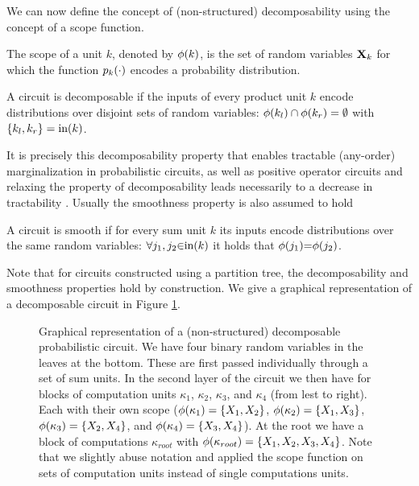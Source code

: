 We can now define the concept of (non-structured) decomposability using the concept of a scope function.


\begin{definition}[Scope]
	\label{def:scope:cond}
	The scope of a unit $k$, denoted by $\phi(k)$, is the set of random variables $\mathbf{X}_k$ for which the function $p_k (\cdot)$ encodes a probability distribution.
\end{definition}

\begin{definition}[Decomposability]
	A circuit is decomposable if the inputs of every product unit
	$k$ encode distributions over disjoint sets of random variables:
	$\phi (k_l) \cap \phi (k_r) = \emptyset$ with $\{k_l, k_r\}= \text{in} (k)$.
\end{definition}

It is precisely this decomposability property that enables tractable (any-order) marginalization in probabilistic circuits, as well as positive operator circuits and relaxing the property of decomposability leads necessarily to a decrease in tractability \citep{choi2020probabilistic,vergari2021compositional,zuidberg2024probabilistic}. Usually the smoothness property is also assumed to hold
\begin{definition}[Smoothness]
	A circuit is smooth if for every sum unit $k$ its inputs encode distributions over the same random variables:
	$\forall j_1, j_2 {\in} \text{in}(k)$ it holds that $\phi(j_1){=}\phi(j_2) $.
\end{definition}
Note that for circuits constructed using a partition tree, the decomposability and smoothness properties hold by construction. We give a graphical representation of a decomposable circuit in Figure \ref{fig:dcircuit}.



\begin{figure}
	\centering

	
	\caption{Graphical representation of a (non-structured) decomposable probabilistic circuit. We have four binary random variables in the leaves at the bottom. These are first passed individually through a set of sum units. In the second layer of the circuit we then have for blocks of computation units $\kappa_1$, $\kappa_2$, $\kappa_3$, and $\kappa_4$ (from lest to right). Each with their own scope ($\phi(\kappa_1)= \{ X_1, X_2  \}$, $\phi(\kappa_2)= \{ X_1, X_3  \}$, $\phi(\kappa_3)= \{ X_2, X_4  \}$, and $\phi(\kappa_4)= \{ X_3, X_4  \}$). At the root we have a block of computations $\kappa_{root}$ with $\phi(\kappa_{root}) = \{ X_1, X_2, X_3, X_4 \}$. Note that we slightly abuse notation and applied the scope function on sets of computation units instead of single computations units.
	}
	\label{fig:dcircuit}
\end{figure}



